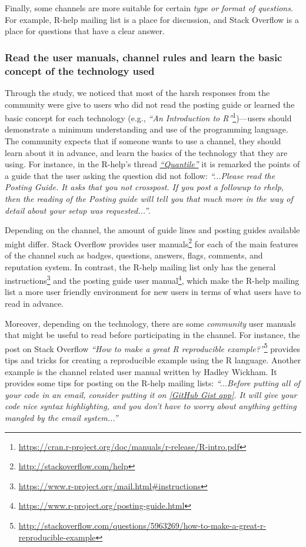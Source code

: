 \documentclass{sig-alternate-05-2015}
\begin{document}
		Finally, some channels are more suitable for certain \emph{type or format of questions}. 
		For example, R-help mailing list is a place for discussion, and Stack Overflow is a place for questions that have a clear answer.


	\subsubsection{Read the user manuals, channel rules and learn the basic concept of the technology used}

		Through the study, we noticed that most of the harsh responses from the community were give to users who did not read the posting guide or learned the basic concept for each technology (e.g., \textit{``An Introduction to R''}\footnote{\url{https://cran.r-project.org/doc/manuals/r-release/R-intro.pdf}})---users should demonstrate a minimum understanding and use of the programming language.
		The community expects that if someone wants to use a channel, they should learn about it in advance, and learn the basics of the technology that they are using.
		For instance, in the R-help's thread \textit{\href{http://goo.gl/Dc8gXw}{``Quantile''}} it is remarked the points of a guide that the user asking the question did not follow: \textit{``...Please read the Posting Guide. It asks that you not crosspost. If you post a followup to rhelp, then the reading of the Posting guide will tell you that much more in the way of detail about your setup was requested...''}.

		Depending on the channel, the amount of guide lines and posting guides available might differ. 
		Stack Overflow provides user manuals\footnote{\url{http://stackoverflow.com/help}} for each of the main features of the channel such as badges, questions, answers, flags, comments, and reputation system.
		In contrast, the R-help mailing list only has the general instructions\footnote{\url{https://www.r-project.org/mail.html\#instructions}} and the posting guide user manual\footnote{\url{https://www.r-project.org/posting-guide.html}}, which make the R-help mailing list a more user friendly environment for new users in terms of what users have to read in advance.

		Moreover, depending on the technology, there are some \textit{community} user manuals that might be useful to read before participating in the channel.
		For instance, the post on Stack Overflow \textit{``How to make a great R reproducible example?''}\footnote{\url{http://stackoverflow.com/questions/5963269/how-to-make-a-great-r-reproducible-example}} provides tips and tricks for creating a reproducible example using the R language.
	 	Another example is the channel related user manual written by Hadley Wickham.
	 	It provides some tips for posting on the R-help mailing lists: \textit{``...Before putting all of your code in an email, consider putting it on \href{http://gist.github.com/}{[GitHub Gist app]}. It will give your code nice syntax highlighting, and you don't have to worry about anything getting mangled by the email system...''}
\end{document}
